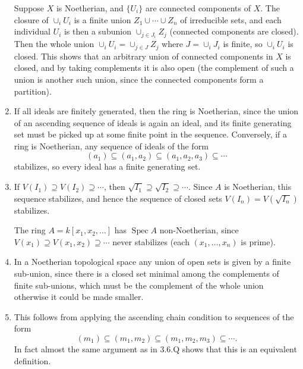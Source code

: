 \documentclass{report}
\newcommand{\rad}[1]{\sqrt{#1}} %
\DeclareMathOperator{\Spec}{Spec}
\begin{document}
\begin{enumerate}[label=\textbf{3.6.\Alph*.}]
	      Suppose $X$ is Noetherian, and $\{U_i\}$ are connected components of $X$.
	      The closure of $\cup_iU_i$ is a finite union $Z_1\cup\cdots\cup Z_n$ of
	      irreducible sets, and each individual $U_i$ is then a subunion
	      $\cup_{j\in J_i}Z_j$ (connected components are closed). Then the whole
	      union $\cup_iU_i = \cup_{j\in J}Z_j$ where $J=\cup_iJ_i$ is finite, so
	      $\cup_iU_i$ is closed. This shows that an arbitrary union of connected
	      components in $X$ is closed, and by taking complements it is also open
	      (the complement of such a union is another such union, since the
	      connected components form a partition).

	\item If all ideals are finitely generated, then the ring is Noetherian,
	      since the union of an ascending sequence of ideals is again an ideal,
	      and its finite generating set must be picked up at some finite point in
	      the sequence. Conversely, if a ring is Noetherian, any sequence of
	      ideals of the form
	      \begin{equation*}
		      (a_1) \subseteq (a_1,a_2) \subseteq (a_1,a_2,a_3) \subseteq \cdots
	      \end{equation*}
	      stabilizes, so every ideal has a finite generating set.

	\item If $V(I_1)\supseteq V(I_2)\supseteq\cdots$, then
	      $\rad{I_1}\supseteq\rad{I_2}\supseteq\cdots$. Since $A$ is Noetherian,
	      this sequence stabilizes, and hence the sequence of closed sets
	      $V(I_n)=V(\rad{I_n})$ stabilizes.

	      The ring $A=k[x_1,x_2,\ldots]$ has $\Spec A$ non-Noetherian, since
	      $V(x_1)\supseteq V(x_1,x_2)\supseteq\cdots$ never stabilizes (each
	      $(x_1,\ldots,x_n)$ is prime).

	\item In a Noetherian topological space any union of open sets is given
	      by a finite sub-union, since there is a closed set minimal among the
	      complements of finite sub-unions, which must be the complement of the
	      whole union otherwise it could be made smaller.

	\item This follows from applying the ascending chain condition to sequences
	      of the form
	      \begin{equation*}
		      (m_1) \subseteq (m_1,m_2) \subseteq (m_1,m_2,m_3) \subseteq \cdots.
	      \end{equation*}
	      In fact almost the same argument as in 3.6.Q shows that this is an
	      equivalent definition.


\end{enumerate}
\end{document}

